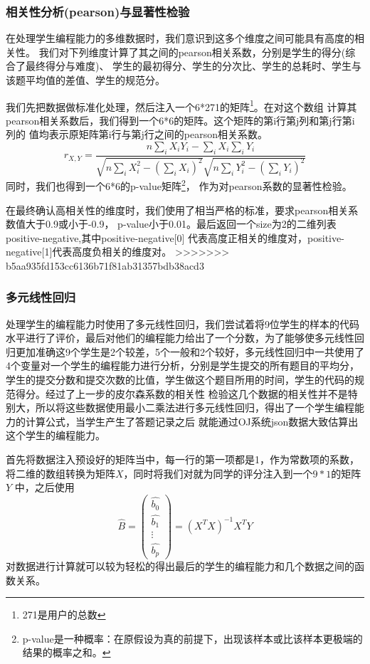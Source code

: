 \documentclass[UTF8]{ctexart}
\begin{document}
\subsubsection{相关性分析(pearson)与显著性检验}
在处理学生编程能力的多维数据时，我们意识到这多个维度之间可能具有高度的相关性。
我们对下列维度计算了其之间的pearson相关系数，分别是学生的得分(综合了最终得分与难度)、
学生的最初得分、学生的分次比、学生的总耗时、学生与该题平均值的差值、学生的规范分。

我们先把数据做标准化处理，然后注入一个6*271的矩阵\footnote{271是用户的总数}。在对这个数组
计算其pearson相关系数后，我们得到一个6*6的矩阵。这个矩阵的第i行第j列和第j行第i列的
值均表示原矩阵第i行与第j行之间的pearson相关系数。$$ r_{X,Y}=\dfrac{n\sum_{i} X_iY_i-\sum_{i} X_i \sum_{i} Y_i}{\sqrt{n\sum_{i} X_i^2-(\sum_{i} X_i)^2}\sqrt{n\sum_{i} Y_i^2-(\sum_{i} Y_i)^2}} $$
同时，我们也得到一个6*6的p-value矩阵\footnote{p-value是一种概率：在原假设为真的前提下，出现该样本或比该样本更极端的结果的概率之和。}，
作为对pearson系数的显著性检验。

在最终确认高相关性的维度时，我们使用了相当严格的标准，要求pearson相关系数值大于0.9或小于-0.9，
p-value小于0.01。最后返回一个size为2的二维列表positive-negative,其中positive-negative[0]
代表高度正相关的维度对，positive-negative[1]代表高度负相关的维度对。
>>>>>>> b5aa935fd153cc6136b71f81ab31357bdb38acd3
\subsubsection{多元线性回归}
处理学生的编程能力时使用了多元线性回归，我们尝试着将9位学生的样本的代码水平进行了评价，最后对他们的编程能力给出了一个分数，为了能够使多元线性回
归更加准确这9个学生是2个较差，5个一般和2个较好，多元线性回归中一共使用了4个变量对一个学生的编程能力进行分析，分别是学生提交的所有题目的平均分，
学生的提交分数和提交次数的比值，学生做这个题目所用的时间，学生的代码的规范得分。经过了上一步的皮尔森系数的相关性
检验这几个数据的相关性并不是特别大，所以将这些数据使用最小二乘法进行多元线性回归，得出了一个学生编程能力的计算公式，当学生产生了答题记录之后
就能通过OJ系统json数据大致估算出这个学生的编程能力。

首先将数据注入预设好的矩阵当中，每一行的第一项都是1，作为常数项的系数，将二维的数组转换为矩阵$X$，同时将我们对就为同学的评分注入到一个$9*1$的矩阵$Y$
中，之后使用\boldmath$$\hat{B}=\begin{pmatrix}
    \hat{b_0}\\\hat{b_1}\\\vdots\\\hat{b_p}
\end{pmatrix}=(X^TX)^{-1}X^TY$$\unboldmath
对数据进行计算就可以较为轻松的得出最后的学生的编程能力和几个数据之间的函数关系。
\end{document}
